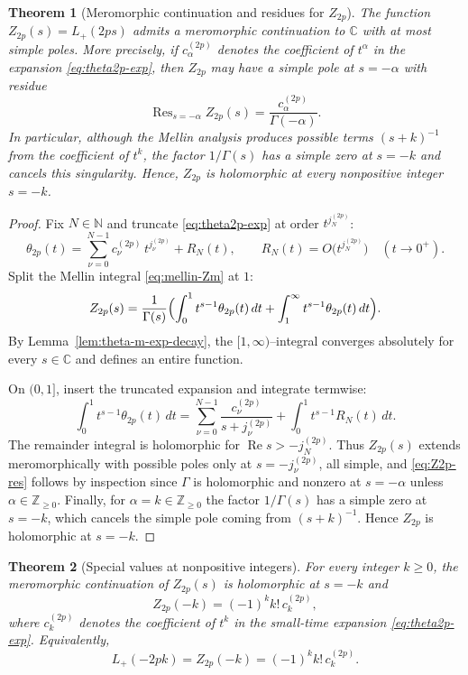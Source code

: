 \documentclass[11pt,letterpaper]{amsart}
\numberwithin{equation}{section}
\newtheorem{theorem}{Theorem}[section]
\theoremstyle{definition}
\newcommand{\C}{\mathbb{C}}
\newcommand{\N}{\mathbb{N}}
\newcommand{\Z}{\mathbb{Z}}
\newcommand{\Ree}{\operatorname{Re}}
\newcommand{\Res}{\operatorname{Res}}
\begin{document}
\begin{theorem}[Meromorphic continuation and residues for $Z_{2p}$]\label{thm:Z2p-meromorphic}
The function $Z_{2p}(s)=L_+(2ps)$ admits a meromorphic continuation to $\C$ with at most simple poles.
More precisely, if $c^{(2p)}_\alpha$ denotes the coefficient of $t^\alpha$ in the expansion
\eqref{eq:theta2p-exp}, then $Z_{2p}$ may have a simple pole at $s=-\alpha$ with residue
\begin{equation}\label{eq:Z2p-res}
\Res_{s=-\alpha} Z_{2p}(s)=\frac{c^{(2p)}_\alpha}{\Gamma(-\alpha)}.
\end{equation}
In particular, although the Mellin analysis produces possible terms $(s+k)^{-1}$ from the coefficient
of $t^k$, the factor $1/\Gamma(s)$ has a simple zero at $s=-k$ and cancels this singularity. Hence, $Z_{2p}$ is holomorphic at every nonpositive integer $s=-k$.

\end{theorem}

\begin{proof}
Fix $N\in\N$ and truncate \eqref{eq:theta2p-exp} at order $t^{j^{(2p)}_{N}}$:
\[
\theta_{2p}(t)=\sum_{\nu=0}^{N-1}c^{(2p)}_\nu\,t^{j^{(2p)}_\nu}+R_N(t),
\qquad R_N(t)=O\!\bigl(t^{j^{(2p)}_{N}}\bigr)\quad(t\to0^+).
\]
Split the Mellin integral \eqref{eq:mellin-Zm} at $1$:
\[
Z_{2p}(s)=\frac{1}{\Gamma(s)}
\Bigl(\int_0^1 t^{s-1}\theta_{2p}(t)\,dt+\int_1^\infty t^{s-1}\theta_{2p}(t)\,dt\Bigr).
\]
By Lemma~\ref{lem:theta-m-exp-decay}, the $[1,\infty)$--integral converges absolutely for every $s\in\C$
and defines an entire function.

On $(0,1]$, insert the truncated expansion and integrate termwise:
\[
\int_0^1 t^{s-1}\theta_{2p}(t)\,dt
=\sum_{\nu=0}^{N-1}\frac{c^{(2p)}_\nu}{s+j^{(2p)}_\nu}+\int_0^1 t^{s-1}R_N(t)\,dt.
\]
The remainder integral is holomorphic for $\Ree s>-j^{(2p)}_{N}$.
Thus $Z_{2p}(s)$ extends meromorphically with possible poles only at $s=-j^{(2p)}_\nu$, all simple,
and \eqref{eq:Z2p-res} follows by inspection since $\Gamma$ is holomorphic and nonzero at $s=-\alpha$
unless $\alpha\in\Z_{\ge0}$.
Finally, for $\alpha=k\in\Z_{\ge0}$ the factor $1/\Gamma(s)$ has a simple zero at $s=-k$,
which cancels the simple pole coming from $(s+k)^{-1}$. Hence $Z_{2p}$ is holomorphic at $s=-k$.
\end{proof}

\begin{theorem}[Special values at nonpositive integers]\label{thm:Z2p-negative}
For every integer $k\ge0$, the meromorphic continuation of $Z_{2p}(s)$ is holomorphic at $s=-k$ and
\begin{equation}\label{eq:Z2p-negative}
Z_{2p}(-k)=(-1)^k k!\,c^{(2p)}_k,
\end{equation}
where $c^{(2p)}_k$ denotes the coefficient of $t^k$ in the small-time expansion \eqref{eq:theta2p-exp}.
Equivalently,
\[
L_+(-2pk)=Z_{2p}(-k)=(-1)^k k!\,c^{(2p)}_k.
\]
\end{theorem}
\end{document}
